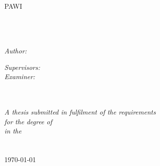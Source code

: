 \documentclass[11pt,oneside]{Thesis} %
\begin{document}
\begin{titlepage}
\begin{center}

\textsc{\LARGE \univname}\\[1.5cm] %
\textsc{\Large PAWI}\\[0.5cm] %

\HRule \\[0.4cm] %
{\huge \bfseries \ttitle}\\[0.4cm] %
\HRule \\[1.5cm] %
 
\begin{minipage}{0.4\textwidth}
\begin{flushleft} \large
\emph{Author:}\\
{\authornames} %
\end{flushleft}
\end{minipage}
\begin{minipage}{0.4\textwidth}
\begin{flushright} \large
\emph{Supervisors:} \\
{\supname} \linebreak \linebreak  %
\emph{Examiner:} \\
{\examname}\\
\end{flushright}
\end{minipage}\\[3cm]
 
\large \textit{A thesis submitted in fulfilment of the requirements\\ for the degree of \degreename}\\[0.3cm] %
\textit{in the}\\[0.4cm]
\groupname\\\deptname\\[2cm] %
 
{\large \today}\\[4cm] %
 
\vfill
\end{center}

\end{titlepage}

\end{document}
